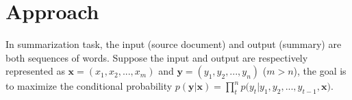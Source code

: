 \section{Approach}
\label{sec:approach}


In summarization task, the input (source document) and
output (summary) are both sequences of words.
Suppose the input and output are respectively represented as
$\textbf{x} = (x_{1},x_{2},...,x_{m})$ and 
$\textbf{y} = (y_{1}, y_{2},..., y_{n})$ ($m>n$),
the goal is to maximize the conditional probability
$p(\textbf{y} | \textbf{x}) \!=\! {\prod^n_{t} {p(y_{t} | y_{1}, y_{2},..., y_{t-1}, \textbf{x}})}$.

